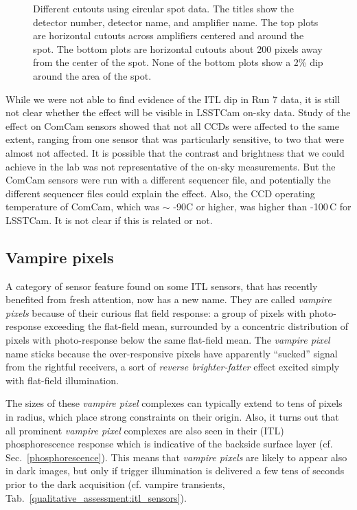 \begin{figure}[ht]
\caption{Different cutouts using circular spot data. The titles show the detector number, detector name, and amplifier name. The top plots are horizontal cutouts across amplifiers centered and around the spot. The bottom plots are horizontal cutouts about 200 pixels away from the center of the spot. None of the bottom plots show a 2\% dip around the area of the spot.}
\label{fig:ITLDip_Spots}
\end{figure}

While we were not able to find evidence of the ITL dip in Run 7 data, it
is still not clear whether the effect will be visible in LSSTCam on-sky data.
Study of the effect on ComCam sensors showed that not all CCDs were affected to the same extent, ranging from one sensor that was particularly sensitive, to two that were almost not affected.
It is possible that the contrast and brightness that we could achieve in the lab was not representative of the on-sky measurements. But the ComCam sensors were run with a different sequencer file, and potentially the different sequencer files could explain the effect. Also, the CCD operating temperature of ComCam, which was $\sim$ -90C or higher, was higher than -100\,C for  LSSTCam. It is not clear if this is related or not.

\clearpage

\subsection{Vampire pixels}\label{vampire-pixels}

A category of sensor feature found on some ITL sensors, that has recently benefited from fresh attention, now has a new name. They are called {\it vampire pixels} because of their curious flat field response: a group of pixels with photo-response exceeding the flat-field mean, surrounded by a concentric distribution of pixels with photo-response below the same flat-field mean. The {\it vampire pixel} name sticks because the over-responsive pixels have apparently ``sucked'' signal from the rightful receivers, a sort of {\it reverse brighter-fatter} effect excited simply with flat-field illumination.

The sizes of these {\it vampire pixel} complexes can typically extend to tens of pixels in radius, which place strong constraints on their origin. Also, it turns out that all prominent {\it vampire pixel} complexes are also seen in their (ITL) phosphorescence response which is indicative of the backside surface layer (cf. Sec.~\ref{phosphorescence}). This means that {\it vampire pixels} are likely to appear also in dark images, but only if trigger illumination is delivered a few tens of seconds prior to the dark acquisition (cf. vampire transients, Tab.~\ref{qualitative_assessment:itl_sensors}).

